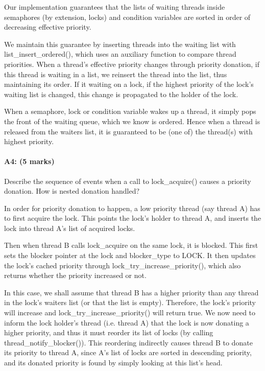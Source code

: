 Our implementation guarantees that the lists of waiting threads inside semaphores (by extension, locks) and condition variables are sorted in order of decreasing effective priority.

We maintain this guarantee by inserting threads into the waiting list with list\_insert\_ordered(), which uses an auxiliary function to compare thread priorities.
When a thread's effective priority changes through priority donation, if this thread is waiting in a list, we reinsert the thread into the list, thus maintaining its order. If it waiting on a lock, if the highest priority of the lock's waiting list is changed, this change is propagated to the holder of the lock.

When a semaphore, lock or condition variable wakes up a thread, it simply pops the front of the waiting queue, which we know is ordered. Hence when a thread is released from the waiters list, it is guaranteed to be (one of) the thread(s) with highest priority.

\paragraph{A4: (5 marks)}
Describe the sequence of events when a call to lock\_acquire() causes a priority donation.  How is nested donation handled?

In order for priority donation to happen, a low priority thread (say thread A) has to first acquire the lock. This points the lock's holder to thread A, and inserts the lock into thread A's list of acquired locks.

Then when thread B calls lock\_acquire on the same lock, it is blocked. This first sets the blocker pointer at the lock and blocker_type to LOCK. It then updates the lock's cached priority through lock_try_increase_priority(), which also returns whether the priority increased or not.

In this case, we shall assume that thread B has a higher priority than any thread in the lock's waiters list (or that the list is empty). Therefore, the lock's priority will increase and lock_try_increase_priority() will return true. We now need to inform the lock holder's thread (i.e. thread A) that the lock is now donating a higher priority, and thus it must reorder its list of locks (by calling thread_notify_blocker()). This reordering indirectly causes thread B to donate its priority to thread A, since A's list of locks are sorted in descending priority, and its donated priority is found by simply looking at this list's head.

